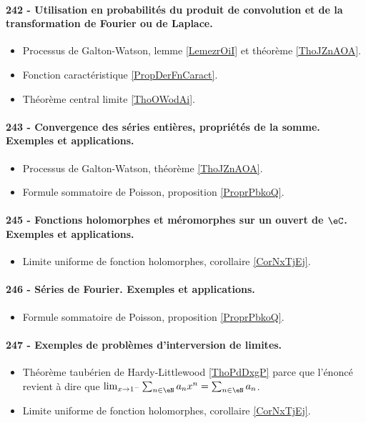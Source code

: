 \paragraph{242 - Utilisation en probabilités du produit de convolution et de la transformation de Fourier ou de Laplace.}
\begin{itemize}
    \item Processus de Galton-Watson, lemme \ref{LemezrOiI} et théorème \ref{ThoJZnAOA}.
    \item Fonction caractéristique \ref{PropDerFnCaract}.
    \item Théorème central limite \ref{ThoOWodAi}.
\end{itemize}

\paragraph{243 - Convergence des séries entières, propriétés de la somme. Exemples et applications.}
\begin{itemize}
    \item Processus de Galton-Watson, théorème \ref{ThoJZnAOA}.
    \item Formule sommatoire de Poisson, proposition \ref{ProprPbkoQ}.
\end{itemize}


\paragraph{245 - Fonctions holomorphes et méromorphes sur un ouvert de \( \eC\). Exemples et applications.}
\begin{itemize}
    \item Limite uniforme de fonction holomorphes, corollaire \ref{CorNxTjEj}.
\end{itemize}

\paragraph{246 - Séries de Fourier. Exemples et applications.}
\begin{itemize}
    \item Formule sommatoire de Poisson, proposition \ref{ProprPbkoQ}.
\end{itemize}
\paragraph{247 - Exemples de problèmes d’interversion de limites.}
\begin{itemize}
    \item Théorème taubérien de Hardy-Littlewood \ref{ThoPdDxgP} parce que l'énoncé revient à dire que \( \lim_{x\to 1^-} \sum_{n\in \eN}a_nx^n=\sum_{n\in \eN}a_n\).
    \item Limite uniforme de fonction holomorphes, corollaire \ref{CorNxTjEj}.
\end{itemize}
